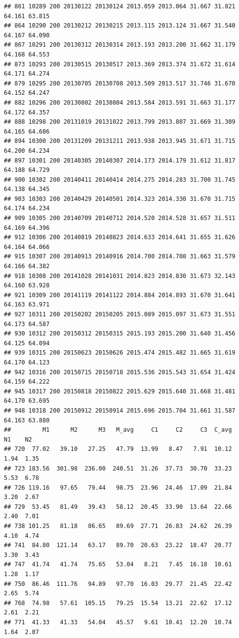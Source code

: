 \documentclass[]{article}
\begin{document}
\begin{verbatim}
## 861 10289 200 20130122 20130124 2013.059 2013.064 31.667 31.821 64.161 63.815
## 864 10290 200 20130212 20130215 2013.115 2013.124 31.667 31.540 64.167 64.090
## 867 10291 200 20130312 20130314 2013.193 2013.200 31.662 31.179 64.168 64.553
## 873 10293 200 20130515 20130517 2013.369 2013.374 31.672 31.614 64.171 64.274
## 879 10295 200 20130705 20130708 2013.509 2013.517 31.746 31.670 64.152 64.247
## 882 10296 200 20130802 20130804 2013.584 2013.591 31.663 31.177 64.172 64.357
## 888 10298 200 20131019 20131022 2013.799 2013.807 31.669 31.309 64.165 64.606
## 894 10300 200 20131209 20131211 2013.938 2013.945 31.671 31.715 64.200 64.234
## 897 10301 200 20140305 20140307 2014.173 2014.179 31.612 31.817 64.188 64.729
## 900 10302 200 20140411 20140414 2014.275 2014.283 31.700 31.745 64.138 64.345
## 903 10303 200 20140429 20140501 2014.323 2014.330 31.670 31.715 64.174 64.234
## 909 10305 200 20140709 20140712 2014.520 2014.528 31.657 31.511 64.169 64.396
## 912 10306 200 20140819 20140823 2014.633 2014.641 31.655 31.626 64.164 64.066
## 915 10307 200 20140913 20140916 2014.700 2014.708 31.663 31.579 64.166 64.382
## 918 10308 200 20141028 20141031 2014.823 2014.830 31.673 32.143 64.160 63.928
## 921 10309 200 20141119 20141122 2014.884 2014.893 31.670 31.641 64.163 63.971
## 927 10311 200 20150202 20150205 2015.089 2015.097 31.673 31.551 64.173 64.587
## 930 10312 200 20150312 20150315 2015.193 2015.200 31.640 31.456 64.125 64.094
## 939 10315 200 20150623 20150626 2015.474 2015.482 31.665 31.619 64.170 64.123
## 942 10316 200 20150715 20150718 2015.536 2015.543 31.654 31.424 64.159 64.222
## 945 10317 200 20150818 20150822 2015.629 2015.640 31.668 31.481 64.170 63.695
## 948 10318 200 20150912 20150914 2015.696 2015.704 31.661 31.587 64.163 63.880
##         M1      M2      M3   M_avg     C1     C2     C3  C_avg    N1    N2
## 720  77.02   39.10   27.25   47.79  13.99   8.47   7.91  10.12  1.94  1.35
## 723 183.56  301.98  236.00  240.51  31.26  37.73  30.70  33.23  5.53  6.78
## 726 119.16   97.65   79.44   98.75  23.96  24.46  17.09  21.84  3.20  2.67
## 729  53.45   81.49   39.43   58.12  20.45  33.90  13.64  22.66  2.40  7.01
## 738 101.25   81.18   86.65   89.69  27.71  26.83  24.62  26.39  4.10  4.74
## 741  84.80  121.14   63.17   89.70  20.63  23.22  18.47  20.77  3.30  3.43
## 747  41.74   41.74   75.65   53.04   8.21   7.45  16.18  10.61  1.28  1.17
## 750  86.46  111.76   94.89   97.70  16.03  29.77  21.45  22.42  2.65  5.74
## 768  74.98   57.61  105.15   79.25  15.54  13.21  22.62  17.12  2.61  2.21
## 771  41.33   41.33   54.04   45.57   9.61  10.41  12.20  10.74  1.64  2.07

\end{verbatim}
\end{document}
